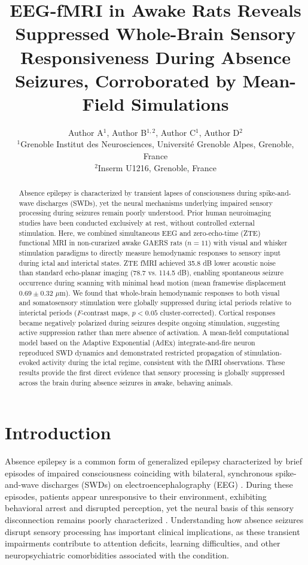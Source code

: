 \documentclass[12pt]{article}
\title{EEG-fMRI in Awake Rats Reveals Suppressed Whole-Brain Sensory Responsiveness During Absence Seizures, Corroborated by Mean-Field Simulations}
\author{Author A$^{1}$, Author B$^{1,2}$, Author C$^{1}$, Author D$^{2}$ \\
\small $^{1}$Grenoble Institut des Neurosciences, Universit\'{e} Grenoble Alpes, Grenoble, France \\
\small $^{2}$Inserm U1216, Grenoble, France}
\date{}
\begin{document}
\maketitle

\begin{abstract}
Absence epilepsy is characterized by transient lapses of consciousness during spike-and-wave discharges (SWDs), yet the neural mechanisms underlying impaired sensory processing during seizures remain poorly understood. Prior human neuroimaging studies have been conducted exclusively at rest, without controlled external stimulation. Here, we combined simultaneous EEG and zero-echo-time (ZTE) functional MRI in non-curarized awake GAERS rats ($n = 11$) with visual and whisker stimulation paradigms to directly measure hemodynamic responses to sensory input during ictal and interictal states. ZTE fMRI achieved 35.8 dB lower acoustic noise than standard echo-planar imaging (78.7 vs. 114.5 dB), enabling spontaneous seizure occurrence during scanning with minimal head motion (mean framewise displacement $0.69 \pm 0.32$ $\mu$m). We found that whole-brain hemodynamic responses to both visual and somatosensory stimulation were globally suppressed during ictal periods relative to interictal periods ($F$-contrast maps, $p < 0.05$ cluster-corrected). Cortical responses became negatively polarized during seizures despite ongoing stimulation, suggesting active suppression rather than mere absence of activation. A mean-field computational model based on the Adaptive Exponential (AdEx) integrate-and-fire neuron reproduced SWD dynamics and demonstrated restricted propagation of stimulation-evoked activity during the ictal regime, consistent with the fMRI observations. These results provide the first direct evidence that sensory processing is globally suppressed across the brain during absence seizures in awake, behaving animals.
\end{abstract}

\section{Introduction}

Absence epilepsy is a common form of generalized epilepsy characterized by brief episodes of impaired consciousness coinciding with bilateral, synchronous spike-and-wave discharges (SWDs) on electroencephalography (EEG) \citep{blumenfeld2005consciousness}. During these episodes, patients appear unresponsive to their environment, exhibiting behavioral arrest and disrupted perception, yet the neural basis of this sensory disconnection remains poorly characterized \citep{coenen2003absence}. Understanding how absence seizures disrupt sensory processing has important clinical implications, as these transient impairments contribute to attention deficits, learning difficulties, and other neuropsychiatric comorbidities associated with the condition.
\end{document}

